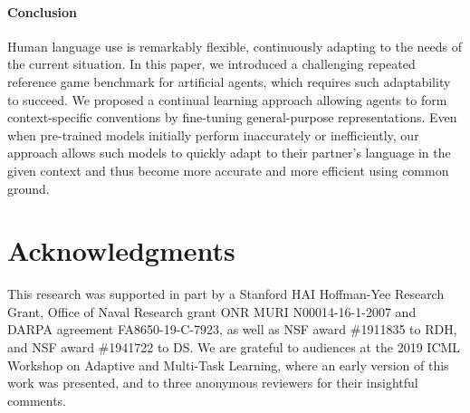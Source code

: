 \documentclass[11pt,a4paper]{article}
\begin{document}
\paragraph{Conclusion}

Human language use is remarkably flexible, continuously adapting to the needs of the current situation.
In this paper, we introduced a challenging repeated reference game benchmark for artificial agents, which requires such adaptability to succeed.
We proposed a continual learning approach allowing agents to form context-specific conventions by fine-tuning general-purpose representations.
Even when pre-trained models initially perform inaccurately or inefficiently, our approach allows such models to quickly adapt to their partner's language in the given context and thus become more accurate and more efficient using common ground.

\section*{Acknowledgments}

This research was supported in part by a Stanford HAI Hoffman-Yee Research Grant, Office of Naval Research grant ONR MURI N00014-16-1-2007 and DARPA agreement FA8650-19-C-7923, as well as NSF award \#1911835 to RDH, and NSF award \#1941722 to DS.
We are grateful to audiences at the 2019 ICML Workshop on Adaptive and Multi-Task Learning, where an early version of this work was presented, and to three anonymous reviewers for their insightful comments.

\vspace{2em}
\vspace{2em} \noindent



\end{document}

